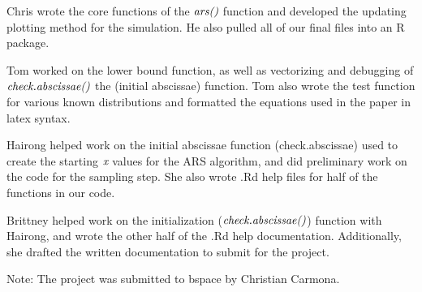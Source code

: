 \documentclass{article}\usepackage[]{graphicx}\usepackage[]{color}
\begin{document}
Chris wrote the core functions of the $\emph{ars()}$ function and developed the updating plotting method for the simulation.  He also pulled all of our final files into an R package.

Tom worked on the lower bound function, as well as vectorizing and debugging of $\emph{check.abscissae()}$ the (initial abscissae) function. Tom also wrote the test function for various known distributions and formatted the equations used in the paper in latex syntax.

Hairong helped work on the initial abscissae function (check.abscissae) used to create the starting $\emph{x}$ values for the ARS algorithm, and did preliminary work on the code for the sampling step.  She also wrote .Rd help files for half of the functions in our code.

Brittney helped work on the initialization ($\emph{check.abscissae()}$) function with Hairong, and wrote the other half of the .Rd help documentation.  Additionally, she drafted the written documentation to submit for the project.


Note: The project was submitted to bspace by Christian Carmona.
\end{document}
